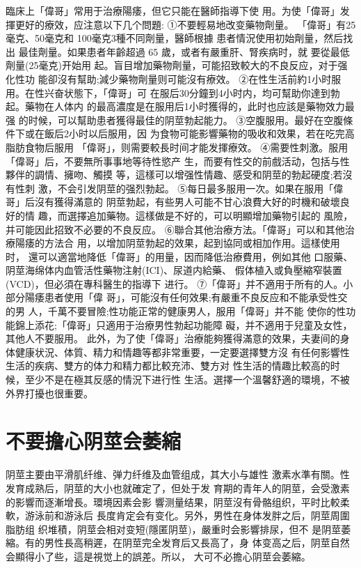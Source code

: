 \documentclass[12pt,UTF8]{ctexbook}
\begin{document}
臨床上「偉哥」常用于治療陽痿，但它只能在醫師指導下使
用。为使「偉哥」发揮更好的療效，应注意以下几个問題:
①不要輕易地改变藥物劑量。
「偉哥」有25毫克、50毫克和
100毫克3種不同劑量，醫師根據
患者情況使用初始劑量，然后找出
最佳劑量。如果患者年齡超過 65
歲，或者有嚴重肝、腎疾病时，就
要從最低劑量(25毫克)开始用
起。盲目增加藥物劑量，可能招致較大的不良反应，对于强化性功
能卻沒有幫助;減少藥物劑量则可能沒有療效。
②在性生活前約1小时服用。在性兴奋状態下，「偉哥」可
在服后30分鐘到4小时内，均可幫助你達到勃起。藥物在人体内
的最高濃度是在服用后1小时獲得的，此时也应該是藥物效力最强
的时候，可以幫助患者獲得最佳的阴莖勃起能力。
③空腹服用。最好在空腹條件下或在飯后2小时以后服用，因
为食物可能影響藥物的吸收和效果，若在吃完高脂肪食物后服用
「偉哥」，则需要較長时间才能发揮療效。
④需要性刺激。服用「偉哥」后，不要無所事事地等待性慾产
生，而要有性交的前戲活动，包括与性夥伴的調情、擁吻、觸摸
等，這樣可以增强性情趣、感受和阴莖的勃起硬度;若沒有性刺
激，不会引发阴莖的强烈勃起。
⑤每日最多服用一次。如果在服用「偉哥」后沒有獲得滿意的
阴莖勃起，有些男人可能不甘心浪費大好的时機和破壞良好的情
趣，而選擇追加藥物。這樣做是不好的，可以明顯增加藥物引起的
風險，并可能因此招致不必要的不良反应。
⑥聯合其他治療方法。「偉哥」可以和其他治療陽痿的方法合
用，以增加阴莖勃起的效果，起到協同或相加作用。這樣使用时，
還可以適當地降低「偉哥」的用量，因而降低治療費用，例如其他
口服藥、阴莖海绵体内血管活性藥物注射(ICI)、尿道内給藥、
假体植入或負壓縮窄裝置(VCD)，但必須在專科醫生的指導下
进行。
⑦「偉哥」并不適用于所有的人。小部分陽痿患者使用「偉
哥」，可能沒有任何效果;有嚴重不良反应和不能承受性交的男
人，千萬不要冒險;性功能正常的健康男人，服用「偉哥」并不能
使你的性功能錦上添花;「偉哥」只適用于治療男性勃起功能障
礙，并不適用于兒童及女性，其他人不要服用。
此外，为了使「偉哥」治療能夠獲得滿意的效果，夫妻间的身
体健康状況、体質、精力和情趣等都非常重要，一定要選擇雙方沒
有任何影響性生活的疾病、雙方的体力和精力都比較充沛、雙方对
性生活的情趣比較高的时候，至少不是在極其反感的情況下进行性
生活。選擇一个溫馨舒適的環境，不被外界打擾也很重要。
\section{不要擔心阴莖会萎縮}
阴莖主要由平滑肌纤维、弹力纤维及血管组成，其大小与雄性
激素水準有關。性发育成熟后，阴莖的大小也就確定了，但处于发
育期的青年人的阴莖，会受激素的影響而逐漸增長。環境因素会影
響测量结果，阴莖沒有骨骼组织，平时比較柔軟，游泳前和游泳后
長度肯定会有变化。另外，男性在身体发胖之后，阴莖周圍脂肪组
织堆積，阴莖会相对变短(隱匿阴莖)，嚴重时会影響排尿，但不
是阴莖萎縮。有的男性長高稍遲，在阴莖完全发育后又長高了，身
体变高之后，阴莖自然会顯得小了些，這是視觉上的誤差。所以，
大可不必擔心阴莖会萎縮。
\end{document}
